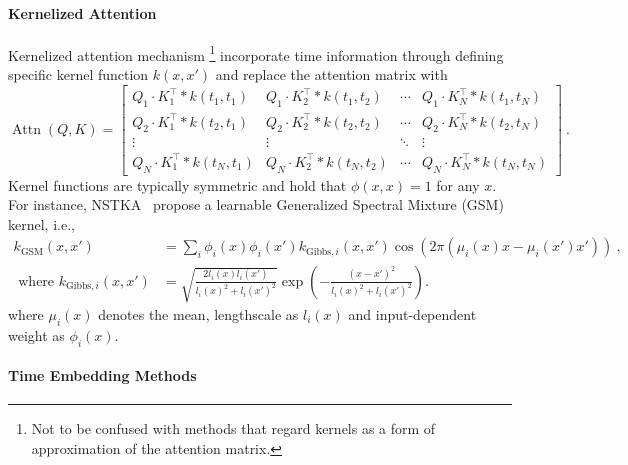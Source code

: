 \paragraph{Kernelized Attention}

Kernelized attention mechanism \footnote{Not to be confused with methods that regard kernels as a form of approximation of the attention matrix.} incorporate time information through defining specific kernel function $k(x, x')$ and replace the attention matrix with
\begin{equation}
\operatorname{Attn}(Q, K)=\left[\begin{array}{cccc}
Q_1 \cdot K_1^\top * k(t_1, t_1) & Q_1 \cdot K_2^\top * k(t_1, t_2) & \cdots & Q_1 \cdot K_N^\top * k(t_1, t_N) \\
Q_2 \cdot K_1^\top * k(t_2, t_1) & Q_2 \cdot K_2^\top * k(t_2, t_2) & \cdots & Q_2 \cdot K_N^\top * k(t_2, t_N) \\
\vdots & \vdots & \ddots & \vdots \\
Q_N \cdot K_1^\top * k(t_N, t_1) & Q_N \cdot K_2^\top * k(t_N, t_2) & \cdots & Q_N \cdot K_N^\top * k(t_N, t_N)
\end{array}\right] ~.
\end{equation}
Kernel functions are typically symmetric and hold that $\phi(x, x)=1$ for any $x$. For instance, NSTKA~\cite{ma2022non} propose a learnable Generalized Spectral Mixture (GSM) kernel, i.e.,
\begin{equation}
\begin{aligned}
k_\text{GSM}\left(x, x'\right) &=
 \sum_i \phi_i(x) \phi_i\left(x'\right) k_{\text{Gibbs}, i}\left(x, x'\right) \cos \left(2 \pi\left(\mu_i(x) x-\mu_i\left(x'\right) x'\right)\right) ~, \\
\text{ where } k_{\text{Gibbs}, i}\left(x, x'\right) &= \sqrt{\frac{2 l_i(x) l_i\left(x'\right)}{l_i(x)^2+l_i\left(x'\right)^2}} \exp \left(-\frac{\left(x-x'\right)^2}{l_i(x)^2+l_i\left(x'\right)^2}\right) .
\end{aligned}
\end{equation}
where $\mu_i(x)$ denotes the mean, lengthscale as $l_i(x)$ and input-dependent weight as $\phi_i(x)$. 

\paragraph{Time Embedding Methods}

